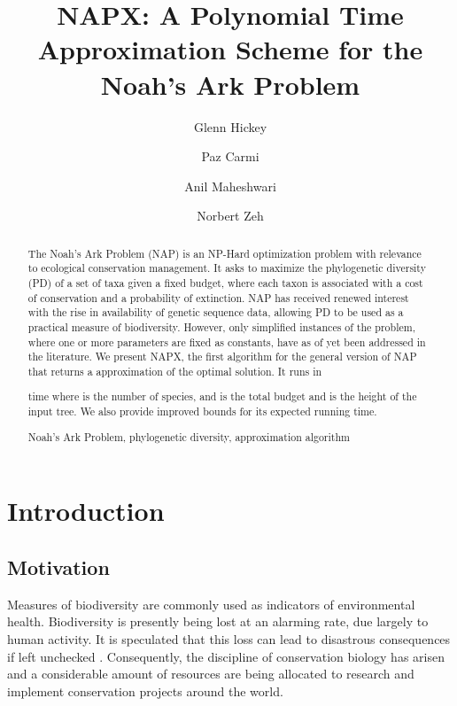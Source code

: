 \documentclass[10pt]{llncs}       \usepackage{graphicx,subfigure}
\newcommand{\keywords}[1]{\par\addvspace\baselineskip
\noindent\keywordname\enspace\ignorespaces#1}
\begin{document}
\title{NAPX: A Polynomial Time Approximation Scheme for the Noah's Ark Problem}
\author{Glenn Hickey
 \and Paz Carmi \and Anil Maheshwari
 \and Norbert Zeh}
\maketitle


\begin{abstract}
The Noah's Ark Problem (NAP) is an NP-Hard 
optimization problem with relevance to
ecological conservation management. It asks to maximize the phylogenetic
diversity (PD) of a set of taxa given a fixed budget, where each taxon
is associated with a cost of conservation and a probability of extinction.
NAP has received renewed interest with
the rise in  availability of genetic sequence data, allowing
PD to be used as a practical measure of biodiversity.  However, only
simplified instances of the problem, where one or more parameters are 
fixed as constants, have as of yet 
been addressed in the literature.  We present NAPX, the first algorithm
for the general version of NAP that returns a  approximation
of the optimal solution.  It runs in 
 
time where  is the number of species, 
and  is the total budget and  is the height of the input tree. 
We also provide improved bounds for its expected running time.
\keywords{Noah's Ark Problem, phylogenetic diversity, approximation algorithm}
\end{abstract}

\section{Introduction}
\subsection{Motivation}

Measures of biodiversity are commonly used as indicators of environmental 
health.  Biodiversity is presently being lost at an alarming rate, 
due largely to human activity.  It is speculated that this loss can lead
to disastrous consequences if left unchecked \cite{nee97}.  
Consequently, the discipline of conservation biology has arisen and
a considerable amount of resources are being allocated to research
and implement conservation projects around the world.
\end{document}
